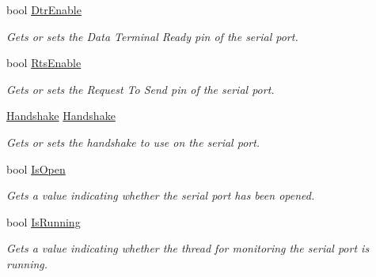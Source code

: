 \begin{DoxyCompactItemize}
bool \mbox{\hyperlink{interface_r_j_c_p_1_1_i_o_1_1_ports_1_1_native_1_1_i_native_serial_a78447c12bcc870a80da56697ec226ca1}{Dtr\+Enable}}
\begin{DoxyCompactList}\small\item\em Gets or sets the Data Terminal Ready pin of the serial port. \end{DoxyCompactList}\item 
bool \mbox{\hyperlink{interface_r_j_c_p_1_1_i_o_1_1_ports_1_1_native_1_1_i_native_serial_a04ee5d783d150fb1e92ef84884a5c99b}{Rts\+Enable}}
\begin{DoxyCompactList}\small\item\em Gets or sets the Request To Send pin of the serial port. \end{DoxyCompactList}\item 
\mbox{\hyperlink{namespace_r_j_c_p_1_1_i_o_1_1_ports_a5328e888558ed5726b3fb7b8b692527c}{Handshake}} \mbox{\hyperlink{interface_r_j_c_p_1_1_i_o_1_1_ports_1_1_native_1_1_i_native_serial_ad0b78a17818f0deff10ee0a4bf859497}{Handshake}}
\begin{DoxyCompactList}\small\item\em Gets or sets the handshake to use on the serial port. \end{DoxyCompactList}\item 
bool \mbox{\hyperlink{interface_r_j_c_p_1_1_i_o_1_1_ports_1_1_native_1_1_i_native_serial_a2f77d45e27094dc1451010cbe1c14be0}{Is\+Open}}
\begin{DoxyCompactList}\small\item\em Gets a value indicating whether the serial port has been opened. \end{DoxyCompactList}\item 
bool \mbox{\hyperlink{interface_r_j_c_p_1_1_i_o_1_1_ports_1_1_native_1_1_i_native_serial_a97ef30c149ca013b121d6e7c9fba3efb}{Is\+Running}}
\begin{DoxyCompactList}\small\item\em Gets a value indicating whether the thread for monitoring the serial port is running. \end{DoxyCompactList}\end{DoxyCompactItemize}
